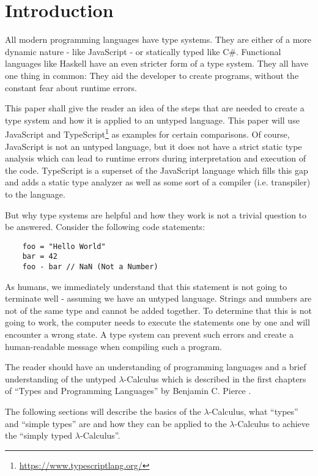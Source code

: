 \section{Introduction}


All modern programming languages have type systems.
They are either of a more dynamic nature - like JavaScript -
or statically typed like C\#. Functional languages like Haskell have
an even stricter form of a type system. They all have one thing in
common: They aid the developer to create programs, without the
constant fear about runtime errors.

This paper shall give the reader an idea of the steps that
are needed to create a type system and how it is applied to
an untyped language. This paper will use JavaScript and TypeScript\footnote{\url{https://www.typescriptlang.org/}}
as examples for certain comparisons.
Of course, JavaScript is not an untyped language, but
it does not have a strict static type analysis which can lead
to runtime errors during interpretation and execution of the code.
TypeScript is a superset of the JavaScript language which fills this
gap and adds a static type analyzer as well as some sort of a compiler
(i.e. transpiler) to the language.

But why type systems are helpful and how they work
is not a trivial question to be answered. Consider
the following code statements:

\begin{verbatim}
    foo = "Hello World"
    bar = 42
    foo - bar // NaN (Not a Number)
\end{verbatim}

As humans, we immediately understand that this statement
is not going to terminate well - assuming we have an untyped
language. Strings and numbers are not
of the same type and cannot be added together. To determine
that this is not going to work, the computer needs to execute
the statements one by one and will encounter a wrong state.
A type system can prevent such errors and create a
human-readable message when compiling such a program.

The reader should have an understanding of programming
languages and a brief understanding of the untyped
$\lambda$-Calculus which is described in the first
chapters of ``Types and Programming Languages'' by
Benjamin C. Pierce \cite{pierce2002ProgLang}.

The following sections will describe the basics of the
$\lambda$-Calculus, what ``types'' and ``simple types'' are
and how they can be applied to the $\lambda$-Calculus to
achieve the ``simply typed $\lambda$-Calculus''.

